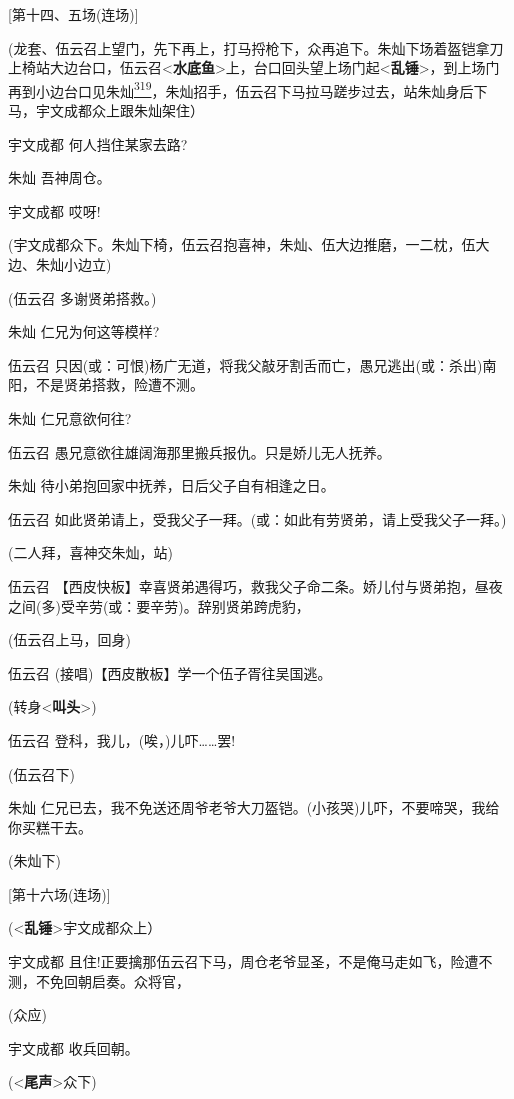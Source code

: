 {[}第十四、五场(连场){]}

(龙套、伍云召上望门，先下再上，打马捋枪下，众再追下。朱灿下场着盔铠拿刀上椅站大边台口，伍云召\textless{}\textbf{水底鱼}\textgreater{}上，台口回头望上场门起\textless{}\textbf{乱锤}\textgreater{}，到上场门再到小边台口见朱灿\protect\hyperlink{fn319}{\textsuperscript{319}}，朱灿招手，伍云召下马拉马蹉步过去，站朱灿身后下马，宇文成都众上跟朱灿架住）

宇文成都 何人挡住某家去路?

朱灿 吾神周仓。

宇文成都 哎呀!

(宇文成都众下。朱灿下椅，伍云召抱喜神，朱灿、伍大边推磨，一二枕，伍大边、朱灿小边立)

(伍云召 多谢贤弟搭救。)

朱灿 仁兄为何这等模样?

伍云召
只因(或：可恨)杨广无道，将我父敲牙割舌而亡，愚兄逃出(或：杀出)南阳，不是贤弟搭救，险遭不测。

朱灿 仁兄意欲何往?

伍云召 愚兄意欲往雄阔海那里搬兵报仇。只是娇儿无人抚养。

朱灿 待小弟抱回家中抚养，日后父子自有相逢之日。

伍云召
如此贤弟请上，受我父子一拜。(或：如此有劳贤弟，请上受我父子一拜。)

(二人拜，喜神交朱灿，站)

伍云召
【西皮快板】幸喜贤弟遇得巧，救我父子命二条。娇儿付与贤弟抱，昼夜之间(多)受辛劳(或：要辛劳)。辞别贤弟跨虎豹，

(伍云召上马，回身)

伍云召 (接唱)【西皮散板】学一个伍子胥往吴国逃。

(转身\textless{}\textbf{叫头}\textgreater{})

伍云召 登科，我儿，(唉，)儿吓\ldots{}\ldots{}罢!

(伍云召下)

朱灿
仁兄已去，我不免送还周爷老爷大刀盔铠。(小孩哭)儿吓，不要啼哭，我给你买糕干去。

(朱灿下)

{[}第十六场(连场){]}

(\textless{}\textbf{乱锤}\textgreater{}宇文成都众上）

宇文成都
且住!正要擒那伍云召下马，周仓老爷显圣，不是俺马走如飞，险遭不测，不免回朝启奏。众将官，

(众应)

宇文成都 收兵回朝。

(\textless{}\textbf{尾声}\textgreater{}众下)

